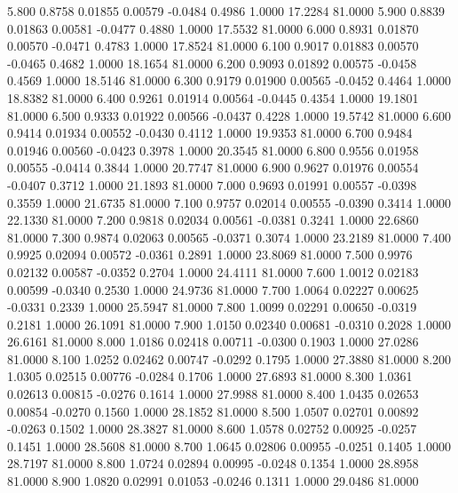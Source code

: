    5.800   0.8758   0.01855   0.00579  -0.0484   0.4986   1.0000  17.2284  81.0000
   5.900   0.8839   0.01863   0.00581  -0.0477   0.4880   1.0000  17.5532  81.0000
   6.000   0.8931   0.01870   0.00570  -0.0471   0.4783   1.0000  17.8524  81.0000
   6.100   0.9017   0.01883   0.00570  -0.0465   0.4682   1.0000  18.1654  81.0000
   6.200   0.9093   0.01892   0.00575  -0.0458   0.4569   1.0000  18.5146  81.0000
   6.300   0.9179   0.01900   0.00565  -0.0452   0.4464   1.0000  18.8382  81.0000
   6.400   0.9261   0.01914   0.00564  -0.0445   0.4354   1.0000  19.1801  81.0000
   6.500   0.9333   0.01922   0.00566  -0.0437   0.4228   1.0000  19.5742  81.0000
   6.600   0.9414   0.01934   0.00552  -0.0430   0.4112   1.0000  19.9353  81.0000
   6.700   0.9484   0.01946   0.00560  -0.0423   0.3978   1.0000  20.3545  81.0000
   6.800   0.9556   0.01958   0.00555  -0.0414   0.3844   1.0000  20.7747  81.0000
   6.900   0.9627   0.01976   0.00554  -0.0407   0.3712   1.0000  21.1893  81.0000
   7.000   0.9693   0.01991   0.00557  -0.0398   0.3559   1.0000  21.6735  81.0000
   7.100   0.9757   0.02014   0.00555  -0.0390   0.3414   1.0000  22.1330  81.0000
   7.200   0.9818   0.02034   0.00561  -0.0381   0.3241   1.0000  22.6860  81.0000
   7.300   0.9874   0.02063   0.00565  -0.0371   0.3074   1.0000  23.2189  81.0000
   7.400   0.9925   0.02094   0.00572  -0.0361   0.2891   1.0000  23.8069  81.0000
   7.500   0.9976   0.02132   0.00587  -0.0352   0.2704   1.0000  24.4111  81.0000
   7.600   1.0012   0.02183   0.00599  -0.0340   0.2530   1.0000  24.9736  81.0000
   7.700   1.0064   0.02227   0.00625  -0.0331   0.2339   1.0000  25.5947  81.0000
   7.800   1.0099   0.02291   0.00650  -0.0319   0.2181   1.0000  26.1091  81.0000
   7.900   1.0150   0.02340   0.00681  -0.0310   0.2028   1.0000  26.6161  81.0000
   8.000   1.0186   0.02418   0.00711  -0.0300   0.1903   1.0000  27.0286  81.0000
   8.100   1.0252   0.02462   0.00747  -0.0292   0.1795   1.0000  27.3880  81.0000
   8.200   1.0305   0.02515   0.00776  -0.0284   0.1706   1.0000  27.6893  81.0000
   8.300   1.0361   0.02613   0.00815  -0.0276   0.1614   1.0000  27.9988  81.0000
   8.400   1.0435   0.02653   0.00854  -0.0270   0.1560   1.0000  28.1852  81.0000
   8.500   1.0507   0.02701   0.00892  -0.0263   0.1502   1.0000  28.3827  81.0000
   8.600   1.0578   0.02752   0.00925  -0.0257   0.1451   1.0000  28.5608  81.0000
   8.700   1.0645   0.02806   0.00955  -0.0251   0.1405   1.0000  28.7197  81.0000
   8.800   1.0724   0.02894   0.00995  -0.0248   0.1354   1.0000  28.8958  81.0000
   8.900   1.0820   0.02991   0.01053  -0.0246   0.1311   1.0000  29.0486  81.0000
